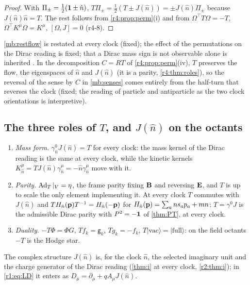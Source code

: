 \begin{proof}
With $\Pi_\pm=\tfrac12(\mathbf 1\pm \hat n)$, $T\Pi_\pm=\tfrac12(T\pm J(\hat n))=\pm J(\hat n)\Pi_\pm$ because $J(\hat n)\hat n=T$. The rest follows from \cref{r4:prop:perm}(i) and from
$\Omega^{\!\top}T\Omega=-T$, $\Omega^{\!\top}K^\mu\Omega=K^\mu$, $[\Omega,J]=0$ (r4-8).
\end{proof}

\cref{mb:restflow} is restated at every clock (fixed); the effect of the permutations on the Dirac reading is fixed; that a Dirac mass
sign is not observable alone is inherited \cite{ItzyksonZuber}. In the decomposition $C=RT$ of \cref{r4:prop:perm}(iv), $T$ preserves the flow,
the eigenspaces of $\hat n$ and $J(\hat n)$ (it is a parity, \cref{r4:thm:roles}), so the reversal of the sense by $C$ in \cref{mb:senses} comes entirely
from the half-turn that reverses the clock (fixed; the reading of particle and antiparticle as the two clock orientations is interpretive).

\subsection{\texorpdfstring{The three roles of $T$, and $J(\hat n)$ on the octants}{The three roles of T, and J(n) on the octants}}
\label{r4:sec:roles}

\begin{theorem}
\label{r4:thm:roles}
\begin{enumerate}[label=(\alph*),leftmargin=2.2em]
\item \emph{Mass form.} $\gamma^0_{\hat n}J(\hat n)=T$ for every clock: the mass kernel of the Dirac reading is the same at every clock, while the kinetic kernels
$K^\mu_{\hat n}=TJ(\hat n)\gamma^\mu_{\hat n}=-\hat n\gamma^\mu_{\hat n}$ move with it.
\item \emph{Parity.} $\operatorname{Ad}_T|_V=\eta$, the frame parity fixing $\mathbf B$ and reversing $\mathbf E$, and $T$ is up to scale the only element implementing it. At every
clock $T$ commutes with $J(\hat n)$ and $TH_{\hat n}(\mathbf p)T^{-1}=H_{\hat n}(-\mathbf p)$ for $H_{\hat n}(\mathbf p)=\sum_ans_ap_a+mn$: $T=\gamma^0J$ is the admissible Dirac parity with $P^2=-\mathbf 1$
of \cref{thm:PT}, at every clock.
\item \emph{Duality.} $-T\Phi=\Phi G$, $Tf_k=\mathsf g_k$, $Tg_k=-f_k$, $T|\mathrm{vac}\rangle=|\mathrm{full}\rangle$: on the field octants $-T$ is the Hodge star.
\end{enumerate}
The complex structure $J(\hat n)$ is, for the clock $\hat n$, the selected imaginary unit and the charge generator of the Dirac reading (\cref{thm:i} at every clock, \cref{r2:thm:i}); in \cref{r1:eq:LD} it enters as $D_\mu=\partial_\mu+qA_\mu J(\hat n)$.
\end{theorem}

